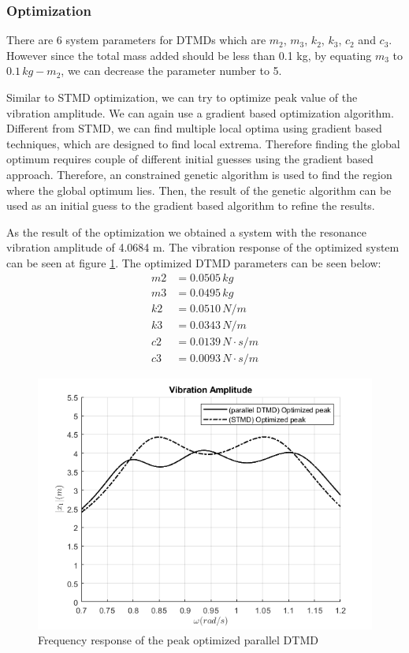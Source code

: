 \subsubsection{Optimization}
There are 6 system parameters for DTMDs which are $m_2$, $m_3$, $k_2$, $k_3$, $c_2$ and $c_3$. However since the total mass added should be less than 0.1 kg, by equating $m_3$ to $0.1\,kg-m_2$, we can decrease the parameter number to 5.
\par
Similar to STMD optimization, we can try to optimize peak value of the vibration amplitude. We can again use a gradient based optimization algorithm. Different from STMD, we can find multiple local optima using gradient based techniques, which are designed to find local extrema. Therefore finding the global optimum requires couple of different initial guesses using the gradient based approach. Therefore, an constrained genetic algorithm is used to find the region where the global optimum lies. Then, the result of the genetic algorithm can be used as an initial guess to the gradient based algorithm to refine the results.
\par
As the result of the optimization we obtained a system with the resonance vibration amplitude of 4.0684 m. The vibration response of the optimized system can be seen at figure \ref{fig:freq_pDTMD}. The optimized DTMD parameters can be seen below:
\begin{align*}
    m2 & = 0.0505 \,kg\\
    m3 & = 0.0495 \,kg\\
    k2 & = 0.0510 \,N/m\\
    k3 & = 0.0343 \,N/m\\
    c2 & = 0.0139 \,N\cdot s/m\\
    c3 & = 0.0093 \,N\cdot s/m
\end{align*}
\begin{figure}
    \centering
    \includegraphics[scale=0.5]{MATLAB Figures/parallel DTMD.png}
    \caption{Frequency response of the peak optimized parallel DTMD}
    \label{fig:freq_pDTMD}
\end{figure}
\newpage
